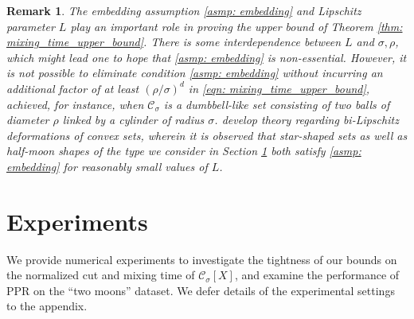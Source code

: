 \documentclass{article}
\newcommand{\1}{\mathbf{1}}
\newcommand{\Xbf}{X}             %
\newcommand{\Cset}{\mathcal{C}}
\newcommand{\Csig}{\Cset_{\sigma}}
\theoremstyle{aldenthm}
\theoremstyle{aldenrmrk}
\newtheorem{remark}{Remark}
\begin{document}
\begin{remark}
  The embedding assumption \ref{asmp: embedding} and Lipschitz parameter $L$
  play an important role in proving the upper bound of Theorem \ref{thm:
    mixing_time_upper_bound}. There is some interdependence between $L$ and
  $\sigma,\rho$, which might lead one to hope that \ref{asmp: embedding} is
  non-essential. However, it is not possible to eliminate condition \ref{asmp:
    embedding} without incurring an additional factor of at least
  $(\rho/\sigma)^d$ in \eqref{eqn: mixing_time_upper_bound}, achieved, for
  instance, when $\Csig$ is a dumbbell-like set consisting of two balls of
  diameter $\rho$ linked by a cylinder of radius
  $\sigma$. \citet{abbasi-yadkori2016, abbasi-yadkori2016a}  
  develop theory regarding bi-Lipschitz deformations of convex sets, wherein it
  is observed that star-shaped sets as well as half-moon shapes of the type we
  consider in Section \ref{sec: experiments} both satisfy \ref{asmp: embedding}
  for reasonably small values of $L$. 
\end{remark}

\section{Experiments}
\label{sec: experiments}

We provide numerical experiments to investigate the tightness of our bounds on
the normalized cut and mixing time of $\Csig[\Xbf]$, and examine the performance
of PPR on the ``two moons'' dataset. We defer details of the experimental
settings to the appendix.   
\end{document}
